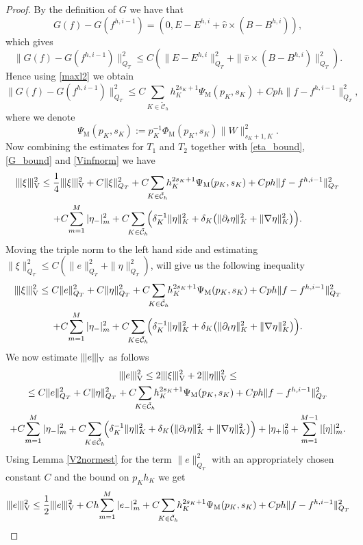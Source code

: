 \documentclass[reqno,a4paper]{amsart}
\theoremstyle{remark}
\numberwithin{equation}{section}
\newcommand{\Vnorm}[1]{|\mkern-1mu|\mkern-1mu|#1|\mkern-1mu|\mkern-1mu|_\mathrm{V}}
\def\d{\partial}
\def\sumK{\sum_{K\in\mathcal{\tilde{C}}_h}\!\!}
\begin{document}
\begin{proof}
By the definition of $G$ we have that
\[
G(f)-G(f^{h,i-1})=(0, E-E^{h,i}+\hat{v}\times(B-B^{h,i})),
\]
which gives
\[
\|G(f)-G(f^{h,i-1})\|_{Q_T}^2\leq C(\|E-E^{h,i}\|_{Q_T}^2+\|\hat{v}\times(B-B^{h,i})\|_{Q_T}^2).
\]
Hence using \eqref{maxl2} we obtain
\begin{equation}\label{G_bound}
\|G(f)-G(f^{h,i-1})\|_{Q_T}^2\leq 
C\!\!\sumK h_K^{2s_K+1}\Psi_\mathrm{M}(p_K,s_K)+Cph\|f-f^{h,i-1}\|^2_{Q_T},
\end{equation}
where we denote
\[
\Psi_\mathrm{M}(p_K,s_K):=p_K^{-1}\Phi_\mathrm{M}(p_K,s_K)\|W\|^2_{s_K+1,K}.
\]
Now combining the estimates for $T_1$ and $T_2$ together with \eqref{eta_bound},
\eqref{G_bound} and \eqref{Vinfnorm} we have
\begin{multline*}
\Vnorm{\xi}^2\leq\frac{1}{4}\Vnorm{\xi}^2+C\|\xi\|_{Q_T}^2
+C\!\!\sumK h_K^{2s_K+1}\Psi_\mathrm{M}(p_K,s_K)+Cph\|f-f^{h,i-1}\|^2_{Q_T}\\
+C\!\sum_{m=1}^M|\eta_-|^2_m+C\!\!\sumK\Big(\delta_K^{-1}\|\eta\|^2_K
+\delta_K\big(\|\d_t\eta\|_K^2+\|\nabla\eta\|_K^2\big)\Big).
\end{multline*}
Moving the triple norm to the left hand side
and estimating $\|\xi\|^2_{Q_T}\leq C(\|e\|^2_{Q_T}+\|\eta\|^2_{Q_T})$,
will give us the following inequality
\begin{multline*}
\Vnorm{\xi}^2\leq C\|e\|_{Q_T}^2+C\|\eta\|_{Q_T}^2
+C\!\!\sumK h_K^{2s_K+1}\Psi_\mathrm{M}(p_K,s_K)+Cph\|f-f^{h,i-1}\|^2_{Q_T}\\
+C\!\sum_{m=1}^M|\eta_-|^2_m+C\!\!\sumK\Big(\delta_K^{-1}\|\eta\|^2_K
+\delta_K\big(\|\d_t\eta\|_K^2+\|\nabla\eta\|_K^2\big)\Big).
\end{multline*}
We now estimate $\Vnorm{e}$ as follows
\begin{multline*}
\Vnorm{e}^2\leq 2\Vnorm{\xi}^2+2\Vnorm{\eta}^2\leq\\
\leq C\|e\|_{Q_T}^2+C\|\eta\|_{Q_T}^2
+C\!\!\sumK h_K^{2s_K+1}\Psi_\mathrm{M}(p_K,s_K)+Cph\|f-f^{h,i-1}\|^2_{Q_T}\\
+C\!\sum_{m=1}^M|\eta_-|^2_m+C\!\!\sumK\Big(\delta_K^{-1}\|\eta\|^2_K
+\delta_K\big(\|\d_t\eta\|_K^2+\|\nabla\eta\|_K^2\big)\Big)
+|\eta_+|^2_0+\sum_{m=1}^{M-1}|[\eta]|^2_m.
\end{multline*}
Using Lemma \ref{V2normest} for the term $\|e\|^2_{Q_T}$
with an appropriately chosen constant $C$ and the bound on $p_Kh_K$ we get
\begin{multline*}
\Vnorm{e}^2\leq \frac{1}{2}\Vnorm{e}^2+Ch\!\sum_{m=1}^M|e_-|^2_m
+C\!\!\sumK h_K^{2s_K+1}\Psi_\mathrm{M}(p_K,s_K)+Cph\|f-f^{h,i-1}\|^2_{Q_T}\\

\end{multline*}
\end{proof}
\end{document}
